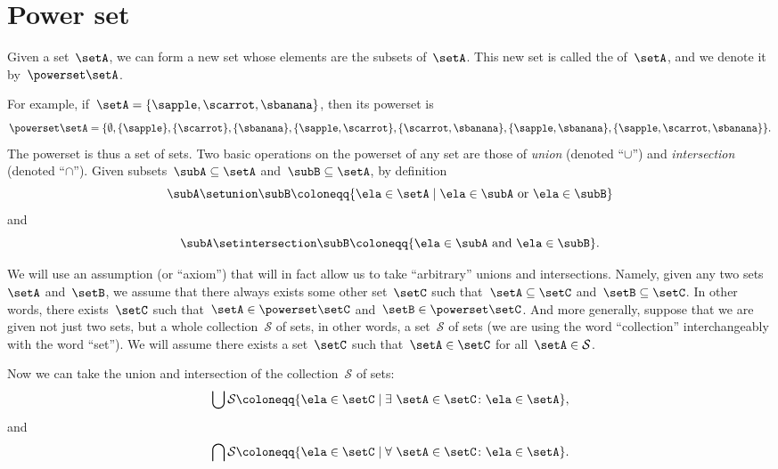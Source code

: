 
\section{Power set}
\label{sec:power-set}
\begin{ctdefinition}
    \label{def:power-set}
    Given a set~$\setA$, we can form a new set whose elements are the subsets of~$\setA$.
    This new set is called the  of~$\setA$, and we denote it by~$\powerset \setA$.
\end{ctdefinition}

For example, if~$\setA = \{ \sapple, \scarrot, \sbanana \}$, then its powerset is
\begin{equation*}
    \powerset \setA = \{ \emptyset, \{ \sapple \}, \{ \scarrot \}, \{ \sbanana\}, \{ \sapple, \scarrot \}, \{ \scarrot, \sbanana \}, \{ \sapple, \sbanana\}, \{ \sapple, \scarrot, \sbanana \} \}.
\end{equation*}
The powerset is thus a set of sets.
Two basic operations on the powerset of any set are those of \emph{union} (denoted ``$\cup$'') and \emph{intersection} (denoted ``$\cap$'').
Given subsets~$\subA \subseteq \setA$ and~$\subB \subseteq \setA$, by definition
%
\begin{equation*}
    \subA \setunion \subB \coloneqq \{ \ela \in \setA \mid \ela \in \subA \text{ or } \ela \in \subB \}
\end{equation*}
%
and
%
\begin{equation*}
    \subA \setintersection \subB \coloneqq \{ \ela \in \subA \text{ and } \ela \in \subB \}.
\end{equation*}

We will use an assumption (or ``axiom'') that will in fact allow us to take ``arbitrary'' unions and intersections.
Namely, given any two sets~$\setA$ and~$\setB$, we assume that there always exists some other set~$\setC$ such that~$\setA \subseteq \setC$ and~$\setB \subseteq \setC$.
In other words, there exists~$\setC$ such that~$\setA \in \powerset \setC$ and~$\setB \in \powerset \setC$.
And more generally, suppose that we are given not just two sets, but a whole collection~$\mathcal{S}$ of sets, in other words, a set~$\mathcal{S}$ of sets (we are using the word ``collection'' interchangeably with the word ``set'').
We will assume there exists a set~$\setC$ such that~$\setA \in \setC$ for all~$\setA \in \mathcal{S}$.

Now we can take the union and intersection of the collection~$\mathcal{S}$ of sets:
%
\begin{equation*}
    \bigcup \mathcal{S} \coloneqq \{ \ela \in \setC \mid \exists \  \setA \in \setC \colon \ela \in \setA \},
\end{equation*}
%
and
%
\begin{equation*}
    \bigcap \mathcal{S} \coloneqq \{ \ela \in \setC \mid \forall \  \setA \in \setC \colon \ela \in \setA \}.
\end{equation*}

